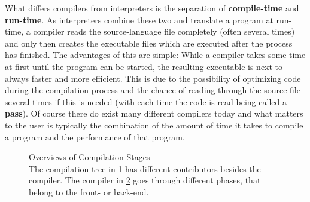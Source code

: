 {What differs compilers from interpreters is the separation of \textbf{compile-time} and \textbf{run-time}.
As interpreters combine these two and translate a program at run-time, a compiler reads the source-language file completely (often several times) and only then creates the executable files which are executed after the process has finished.
The advantages of this are simple:
While a compiler takes some time at first until the program can be started, the resulting executable is next to always faster and more efficient.
This is due to the possibility of optimizing code during the compilation process and the chance of reading through the source file several times if this is needed (with each time the code is read being called a \textbf{pass}).
Of course there do exist many different compilers today and what matters to the user is typically the combination of the amount of time it takes to compile a program and the performance of that program.
\begin{figure}[htb]
    \centering
    \begin{subfigure}[t]{0.25\textwidth}
        
        \caption{\label{fig:cmpstruct} }
    \end{subfigure} \hspace{2cm}
    \begin{subfigure}[t]{0.37\textwidth}
        
        \caption{\label{fig:cmpintstruct} }
    \end{subfigure}
    \caption{\label{fig:cmp} Overviews of Compilation Stages \\ The compilation tree in \ref{fig:cmpstruct} has different contributors besides the compiler. The compiler in \ref{fig:cmpintstruct} goes through different phases, that belong to the front- or back-end.}
\end{figure}

}
